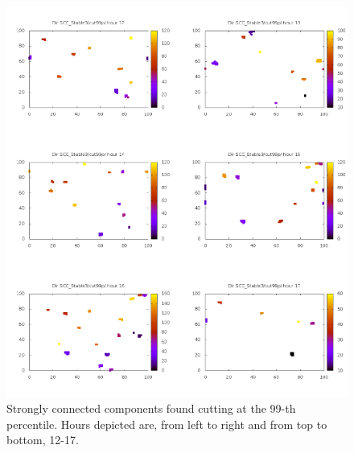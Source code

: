 \documentclass[12pt,a4paper]{article}
\begin{document}
\begin{figure}
\includegraphics[scale=0.8]{tarjan3.png}
\caption{Strongly connected components found cutting at the 99-th percentile. Hours depicted are, from left to right and from top to bottom, 12-17.}
\label{fig:tarjan3}
\end{figure}
\end{document}
